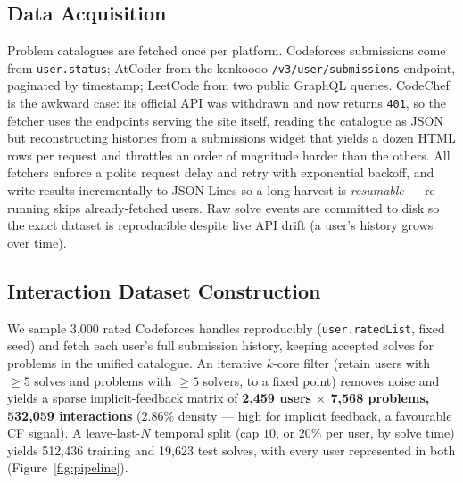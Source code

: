 \documentclass[12pt,a4paper]{article}
\begin{document}
\subsection{Data Acquisition}
Problem catalogues are fetched once per platform. Codeforces submissions come from
\texttt{user.status}; AtCoder from the kenkoooo \texttt{/v3/user/submissions} endpoint,
paginated by timestamp; LeetCode from two public GraphQL queries. CodeChef is the
awkward case: its official API was withdrawn and now returns \texttt{401}, so the fetcher
uses the endpoints serving the site itself, reading the catalogue as JSON but
reconstructing histories from a submissions widget that yields a dozen HTML rows per
request and throttles an order of magnitude harder than the others. All fetchers enforce
a polite request delay and retry with exponential backoff, and write results
incrementally to JSON Lines so a long harvest is \emph{resumable} --- re-running skips
already-fetched users. Raw solve events are committed to disk so the exact dataset is
reproducible despite live API drift (a user's history grows over time).

\subsection{Interaction Dataset Construction}
\label{sec:impl-data}
We sample 3{,}000 rated Codeforces handles reproducibly (\texttt{user.ratedList}, fixed
seed) and fetch each user's full submission history, keeping accepted solves for problems
in the unified catalogue. An iterative $k$-core filter (retain users with $\geq5$ solves
and problems with $\geq5$ solvers, to a fixed point) removes noise and yields a sparse
implicit-feedback matrix of \textbf{2{,}459 users $\times$ 7{,}568 problems, 532{,}059
interactions} ($2.86\%$ density --- high for implicit feedback, a favourable CF signal).
A leave-last-$N$ temporal split (cap $10$, or $20\%$ per user, by solve time) yields
512{,}436 training and 19{,}623 test solves, with every user represented in both
(Figure~\ref{fig:pipeline}).
\end{document}
